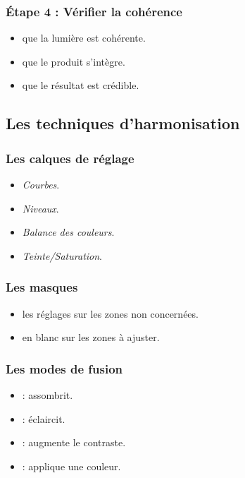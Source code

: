\subsubsection{Étape 4 : Vérifier la cohérence}

\begin{itemize}
    \item {} que la lumière est cohérente.
    \item {} que le produit s'intègre.
    \item {} que le résultat est crédible.
\end{itemize}

\subsection{Les techniques d'harmonisation}

\subsubsection{Les calques de réglage}

\begin{itemize}
    \item {} \emph{Courbes}.
    \item {} \emph{Niveaux}.
    \item {} \emph{Balance des couleurs}.
    \item {} \emph{Teinte/Saturation}.
\end{itemize}

\subsubsection{Les masques}

\begin{itemize}
    \item {} les réglages sur les zones non concernées.
    \item {} en blanc sur les zones à ajuster.
\end{itemize}

\subsubsection{Les modes de fusion}

\begin{itemize}
    \item {} : assombrit.
    \item {} : éclaircit.
    \item {} : augmente le contraste.
    \item {} : applique une couleur.
\end{itemize}

